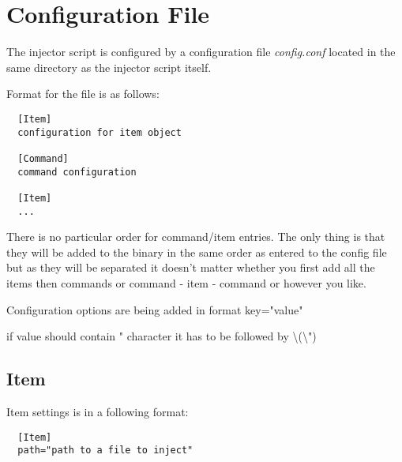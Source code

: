 \chapter{Configuration File}
The injector script is configured by a configuration file \emph{config.conf} located in the same directory as the injector script itself.

Format for the file is as follows:
\begin{lstlisting}
  [Item]
  configuration for item object

  [Command]
  command configuration

  [Item]
  ...

\end{lstlisting}

There is no particular order for command/item entries. The only thing is that they will be added to the binary in the same order as entered to the config file but as they will be separated it doesn't matter whether you first add all the items then commands or command - item - command or however you like.

Configuration options are being added in format key="value"

if value should contain " character it has to be followed by \textbackslash\space(\textbackslash")

\section{Item}
Item settings is in a following format:
\begin{lstlisting}
  [Item]
  path="path to a file to inject"

\end{lstlisting}